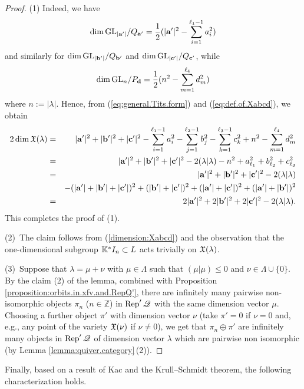 \documentclass[12pt,reqno]{amsart}
\begin{document}
\begin{proof}
(1) Indeed, we have
$$
\dim\mathrm{GL}_{|\mathbf{a}'|}/Q_{\mathbf{a}'}=\frac{1}{2}(|\mathbf{a}'|^2-\sum_{i=1}^{\ell_1-1}a_i^2)
$$
and similarly for $\dim\mathrm{GL}_{|\mathbf{b}'|}/Q_{\mathbf{b}'}$ and $\dim\mathrm{GL}_{|\mathbf{c}'|}/Q_{\mathbf{c}'}$, while
$$
\dim\mathrm{GL}_{n}/P_{\mathbf{d}}=\frac{1}{2}(n^2-\sum_{m=1}^{\ell_4}d_m^2)
$$
where $n:=|\lambda|$.
Hence, from (\ref{eq:general.Tits.form}) and (\ref{eq:def.of.Xabcd}), we obtain
\begin{eqnarray*}
    2\dim\mathfrak{X}(\lambda) & = & |\mathbf{a}'|^2+|\mathbf{b}'|^2+|\mathbf{c}'|^2
    -\sum_{i=1}^{\ell_1-1}a_i^2
    -\sum_{j=1}^{\ell_2-1}b_j^2
    -\sum_{k=1}^{\ell_3-1}c_k^2
    +n^2-\sum_{m=1}^{\ell_4}d_m^2
    \\
    & = &
    |\mathbf{a}'|^2+|\mathbf{b}'|^2+|\mathbf{c}'|^2
    -2(\lambda|\lambda)
    -n^2+a_{\ell_1}^2+b_{\ell_2}^2
    +c_{\ell_3}^2
    \\
    & = &
    |\mathbf{a}'|^2+|\mathbf{b}'|^2+|\mathbf{c}'|^2-2(\lambda|\lambda)
    \\
    &&
    -(|\mathbf{a}'|+|\mathbf{b}'|+|\mathbf{c}'|)^2+(|\mathbf{b}'|+|\mathbf{c}'|)^2+(|\mathbf{a}'|+|\mathbf{c}'|)^2
    +(|\mathbf{a}'|+|\mathbf{b}'|)^2
    \\
    & = &
    2|\mathbf{a}'|^2+2|\mathbf{b}'|^2+2|\mathbf{c}'|^2
    -2(\lambda|\lambda).
\end{eqnarray*}
%
This completes the proof of (1).

(2)\
The claim follows from (\ref{dimension:Xabcd}) and the observation that the one-dimensional subgroup $\mathbb{K}^*I_n\subset L$ acts trivially on $\mathfrak{X}(\lambda)$.

(3)\
Suppose that $\lambda=\mu+\nu$ with $\mu\in\Lambda$ such that
$(\mu|\mu)\leq 0$ and $\nu\in\Lambda\cup\{0\}$.
By the claim (2) of the lemma,
combined with Proposition \ref{proposition:orbits.in.xfv.and.RepQ'},
there are infinitely many pairwise non-isomorphic objects $\pi_n$ ($n\in\mathbb{Z}$)
in $\Rep'\quiver$ with the same dimension vector $\mu$.
Choosing a further object $\pi'$ with dimension vector $\nu$ (take $\pi'=0$ if $\nu=0$ and, e.g., any point of the variety $\mathfrak{X}(\nu)$ if $\nu\not=0$), we get that $\pi_n\oplus\pi'$ are infinitely many objects in $\Rep'\quiver$ of dimension vector $\lambda$ which are pairwise non isomorphic (by Lemma \ref{lemma:quiver.category}\,(2)).
\end{proof}


Finally, based on a result of Kac \cite{Kac.Quiver.1980} and the Krull--Schmidt theorem, the following characterization holds.
\end{document}
